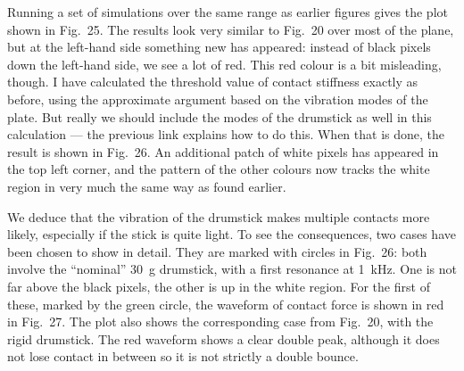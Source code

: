   Running a set of simulations over the same range as earlier figures gives the 
  plot shown in Fig.\ 25. The results look very similar to Fig.\ 20 over most 
  of the plane, but at the left-hand side something new has appeared: instead 
  of black pixels down the left-hand side, we see a lot of red. This red colour 
  is a bit misleading, though. I have calculated the threshold value of contact 
  stiffness exactly as before, using the approximate argument based on the 
  vibration modes of the plate. But really we should include the modes of the 
  drumstick as well in this calculation — the previous link explains how to do 
  this. When that is done, the result is shown in Fig.\ 26. An additional patch 
  of white pixels has appeared in the top left corner, and the pattern of the 
  other colours now tracks the white region in very much the same way as found 
  earlier. 



  We deduce that the vibration of the drumstick makes multiple contacts more 
  likely, especially if the stick is quite light. To see the consequences, two 
  cases have been chosen to show in detail. They are marked with circles in 
  Fig.\ 26: both involve the “nominal” 30~g drumstick, with a first resonance 
  at 1~kHz. One is not far above the black pixels, the other is up in the white 
  region. For the first of these, marked by the green circle, the waveform of 
  contact force is shown in red in Fig.\ 27. The plot also shows the 
  corresponding case from Fig.\ 20, with the rigid drumstick. The red waveform 
  shows a clear double peak, although it does not lose contact in between so it 
  is not strictly a double bounce. 

